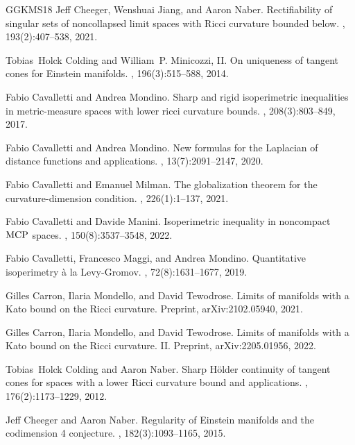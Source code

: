 \documentclass[11pt]{article}
\numberwithin{equation}{section}
\begin{document}
{\begin{thebibliography}{GGKMS18}
Jeff Cheeger, Wenshuai Jiang, and Aaron Naber.
\newblock Rectifiability of singular sets of noncollapsed limit spaces with
  {R}icci curvature bounded below.
, 193(2):407--538, 2021.

Tobias~Holck Colding and William~P. Minicozzi, II.
\newblock On uniqueness of tangent cones for {E}instein manifolds.
, 196(3):515--588, 2014.

Fabio Cavalletti and Andrea Mondino.
\newblock Sharp and rigid isoperimetric inequalities in metric-measure spaces
  with lower ricci curvature bounds.
, 208(3):803--849, 2017.

Fabio Cavalletti and Andrea Mondino.
\newblock New formulas for the {L}aplacian of distance functions and
  applications.
, 13(7):2091--2147, 2020.

Fabio Cavalletti and Emanuel Milman.
\newblock The globalization theorem for the curvature-dimension condition.
, 226(1):1--137, 2021.

Fabio Cavalletti and Davide Manini.
\newblock Isoperimetric inequality in noncompact {$\rm{MCP}$} spaces.
, 150(8):3537--3548, 2022.

Fabio Cavalletti, Francesco Maggi, and Andrea Mondino.
\newblock Quantitative isoperimetry \`a la {L}evy-{G}romov.
, 72(8):1631--1677, 2019.

Gilles Carron, Ilaria Mondello, and David Tewodrose.
\newblock Limits of manifolds with a {K}ato bound on the {R}icci curvature.
\newblock Preprint, arXiv:2102.05940, 2021.

Gilles Carron, Ilaria Mondello, and David Tewodrose.
\newblock Limits of manifolds with a {K}ato bound on the {R}icci curvature.
  {II}.
\newblock Preprint, arXiv:2205.01956, 2022.

Tobias~Holck Colding and Aaron Naber.
\newblock Sharp {H}\"older continuity of tangent cones for spaces with a lower
  {R}icci curvature bound and applications.
, 176(2):1173--1229, 2012.

Jeff Cheeger and Aaron Naber.
\newblock Regularity of {E}instein manifolds and the codimension 4 conjecture.
, 182(3):1093--1165, 2015.


\end{thebibliography}}
\end{document}
